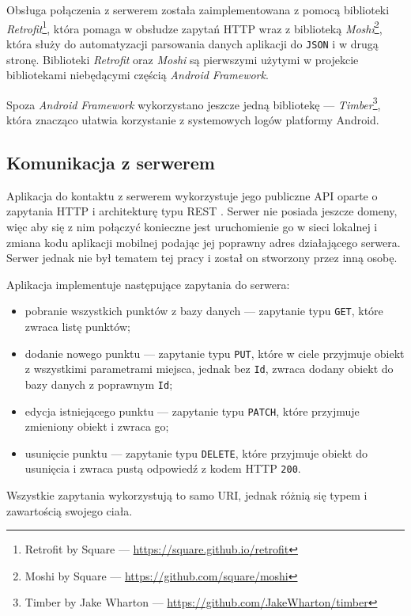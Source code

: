 \documentclass[polish,polish,a4paper,12pt]{article}
\begin{document}
	Obsługa połączenia z serwerem została zaimplementowana z pomocą biblioteki \textit{Retrofit}\footnote{Retrofit by Square — \url{https://square.github.io/retrofit}}, która pomaga w obsłudze zapytań HTTP wraz z biblioteką \textit{Moshi}\footnote{Moshi by Square — \url{https://github.com/square/moshi}}, która służy do automatyzacji parsowania danych aplikacji do \texttt{JSON} i w drugą stronę. Biblioteki \textit{Retrofit} oraz \textit{Moshi} są pierwszymi użytymi w projekcie bibliotekami niebędącymi częścią \textit{Android Framework}.

	Spoza \textit{Android Framework} wykorzystano jeszcze jedną bibliotekę — \textit{Timber}\footnote{Timber by Jake Wharton — \url{https://github.com/JakeWharton/timber}}, która znacząco ułatwia korzystanie z systemowych logów platformy Android.

	\subsection{Komunikacja z serwerem}

	Aplikacja do kontaktu z serwerem wykorzystuje jego publiczne API oparte o zapytania HTTP i architekturę typu REST \cite{restwiki}. Serwer nie posiada jeszcze domeny, więc aby się z nim połączyć konieczne jest uruchomienie go w sieci lokalnej i zmiana kodu aplikacji mobilnej podając jej poprawny adres działającego serwera. Serwer jednak nie był tematem tej pracy i został on stworzony przez inną osobę.

	Aplikacja implementuje następujące zapytania do serwera:

	\begin{itemize}
		\item pobranie wszystkich punktów z bazy danych — zapytanie typu \texttt{GET}, które zwraca listę punktów;
		\item dodanie nowego punktu — zapytanie typu \texttt{PUT}, które w ciele przyjmuje obiekt z wszystkimi parametrami miejsca, jednak bez \texttt{Id}, zwraca dodany obiekt do bazy danych z poprawnym \texttt{Id};
		\item edycja istniejącego punktu — zapytanie typu \texttt{PATCH}, które przyjmuje zmieniony obiekt i zwraca go;
		\item usunięcie punktu — zapytanie typu \texttt{DELETE}, które przyjmuje obiekt do usunięcia i zwraca pustą odpowiedź z kodem HTTP \texttt{200}.
	\end{itemize}

	Wszystkie zapytania wykorzystują to samo URI, jednak różnią się typem i zawartością swojego ciała.
\end{document}
